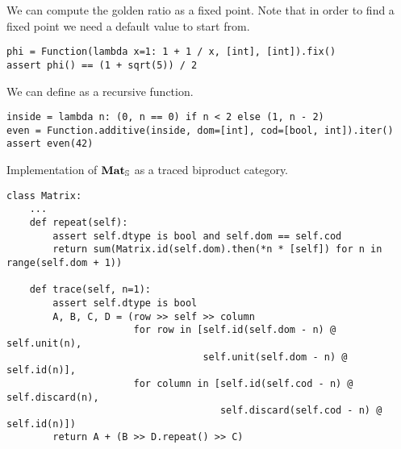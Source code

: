 \begin{example}
We can compute the golden ratio as a fixed point.
Note that in order to find a fixed point we need a default value to start from.

\begin{verbatim}
phi = Function(lambda x=1: 1 + 1 / x, [int], [int]).fix()
assert phi() == (1 + sqrt(5)) / 2
\end{verbatim}

We can define  as a recursive function.

\begin{verbatim}
inside = lambda n: (0, n == 0) if n < 2 else (1, n - 2)
even = Function.additive(inside, dom=[int], cod=[bool, int]).iter()
assert even(42)
\end{verbatim}
\end{example}

\begin{python}\label{listing:traced-matrix}
{\normalfont Implementation of $\mathbf{Mat}_\S$ as a traced biproduct category.}

\begin{verbatim}
class Matrix:
    ...
    def repeat(self):
        assert self.dtype is bool and self.dom == self.cod
        return sum(Matrix.id(self.dom).then(*n * [self]) for n in range(self.dom + 1))

    def trace(self, n=1):
        assert self.dtype is bool
        A, B, C, D = (row >> self >> column
                      for row in [self.id(self.dom - n) @ self.unit(n),
                                  self.unit(self.dom - n) @ self.id(n)],
                      for column in [self.id(self.cod - n) @ self.discard(n),
                                     self.discard(self.cod - n) @ self.id(n)])
        return A + (B >> D.repeat() >> C)
\end{verbatim}
\end{python}
